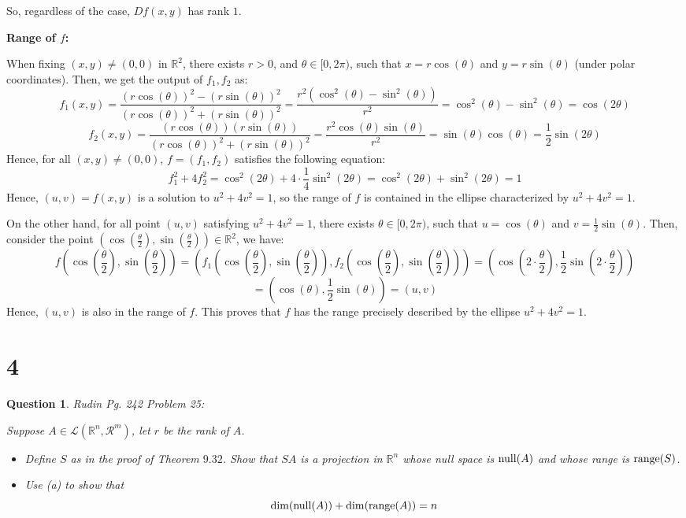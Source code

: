 \documentclass{article}
\newtheorem{question}{Question}
\begin{document}
So, regardless of the case, $Df(x,y)$ has rank $1$.

\hfil

\textbf{Range of $f$:}

When fixing $(x,y)\neq (0,0)$ in $\mathbb{R}^2$, there exists $r>0$, and $\theta\in [0,2\pi)$, such that $x=r\cos(\theta)$ and $y=r\sin(\theta)$ (under polar coordinates). Then, we get the output of $f_1,f_2$ as:
$$f_1(x,y)=\frac{(r\cos(\theta))^2-(r\sin(\theta))^2}{(r\cos(\theta))^2+(r\sin(\theta))^2}=\frac{r^2(\cos^2(\theta)-\sin^2(\theta))}{r^2} = \cos^2(\theta)-\sin^2(\theta) = \cos(2\theta)$$
$$f_2(x,y)=\frac{(r\cos(\theta))(r\sin(\theta))}{(r\cos(\theta))^2+(r\sin(\theta))^2} = \frac{r^2\cos(\theta)\sin(\theta)}{r^2} = \sin(\theta)\cos(\theta) = \frac{1}{2}\sin(2\theta)$$
Hence, for all $(x,y)\neq (0,0)$, $f=(f_1,f_2)$ satisfies the following equation:
$$f_1^2 + 4f_2^2 = \cos^2(2\theta) + 4\cdot \frac{1}{4}\sin^2(2\theta) = \cos^2(2\theta)+\sin^2(2\theta) = 1$$
Hence, $(u,v)=f(x,y)$ is a solution to $u^2+4v^2=1$, so the range of $f$ is contained in the ellipse characterized by $u^2+4v^2=1$.

On the other hand, for all point $(u,v)$ satisfying $u^2+4v^2=1$, there exists $\theta\in [0,2\pi)$, such that $u=\cos(\theta)$ and $v=\frac{1}{2}\sin(\theta)$. Then, consider the point $(\cos(\frac{\theta}{2}),\sin(\frac{\theta}{2}))\in\mathbb{R}^2$, we have:
$$f(\cos(\frac{\theta}{2}),\sin(\frac{\theta}{2})) = (f_1(\cos(\frac{\theta}{2}),\sin(\frac{\theta}{2})),f_2(\cos(\frac{\theta}{2}),\sin(\frac{\theta}{2}))) = \left(\cos\left(2\cdot\frac{\theta}{2}\right),\frac{1}{2}\sin\left(2\cdot\frac{\theta}{2}\right)\right)$$
$$ = \left(\cos(\theta),\frac{1}{2}\sin(\theta)\right) = (u,v)$$
Hence, $(u,v)$ is also in the range of $f$. This proves that $f$ has the range precisely described by the ellipse $u^2+4v^2=1$.

\break

\section*{4}
\begin{myBox}[]{}
    \begin{question}
        Rudin Pg. 242 Problem 25:

        Suppose $A\in\mathcal{L}(\mathbb{R}^n,\mathcal{R}^m)$, let $r$ be the rank of $A$.
        \begin{itemize}
            \item[(a)] Define $S$ as in the proof of Theorem $9.32$. Show that $SA$ is a projection in $\mathbb{R}^n$ whose null space is $\textmd{null}(A)$ and whose range is $\textmd{range}(S)$.
            \item[(b)] Use (a) to show that 
            $$\dim(\textmd{null}(A))+\dim(\textmd{range}(A))=n$$
        \end{itemize}
    \end{question}
\end{myBox}
\end{document}
